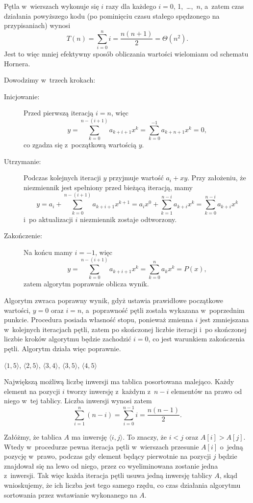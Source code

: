 Pętla  w~wierszach \doubledash{\ref{li:naive-polynomial-evaluation-for-begin}}{\ref{li:naive-polynomial-evaluation-for-end}} wykonuje się $i$ razy dla każdego $i=0$, 1,~\dots,~$n$, a~zatem czas działania powyższego kodu (po pominięciu czasu stałego spędzonego na przypisaniach) wynosi
\[
	T(n) = \sum_{i=0}^ni = \frac{n(n+1)}{2} = \Theta(n^2).
\]
Jest to więc mniej efektywny sposób obliczania wartości wielomianu od schematu Hornera.

\subproblem %
Dowodzimy w~trzech krokach:
\begin{description}
	\item[Inicjowanie:] Przed pierwszą iteracją $i=n$, więc
	\[
	    y = \sum_{k=0}^{n-(i+1)}a_{k+i+1}x^k = \sum_{k=0}^{-1}a_{k+n+1}x^k = 0,
	\]
	co zgadza się z~początkową wartością $y$.
	\item[Utrzymanie:] Podczas kolejnych iteracji $y$ przyjmuje wartość $a_i+xy$. Przy założeniu, że niezmiennik jest spełniony przed bieżącą iteracją, mamy
	\[
		y = a_i+\sum_{k=0}^{n-(i+1)}a_{k+i+1}x^{k+1} = a_ix^0+\sum_{k=1}^{n-i}a_{k+i}x^k = \sum_{k=0}^{n-i}a_{k+i}x^k
	\]
	i~po aktualizacji $i$ niezmiennik zostaje odtworzony.
	\item[Zakończenie:] Na końcu mamy $i=-1$, więc
	\[
		y = \sum_{k=0}^{n-(i+1)}a_{k+i+1}x^k = \sum_{k=0}^na_kx^k = P(x),
	\]
	zatem algorytm poprawnie oblicza wynik.
\end{description}

\subproblem %
Algorytm zwraca poprawny wynik, gdyż ustawia prawidłowe początkowe wartości, $y=0$ oraz $i=n$, a~poprawność pętli  została wykazana w~poprzednim punkcie. Procedura posiada własność stopu, ponieważ zmienna $i$ jest zmniejszana w~kolejnych iteracjach pętli, zatem po skończonej liczbie iteracji i~po skończonej liczbie kroków algorytmu będzie zachodzić $i=0$, co jest warunkiem zakończenia pętli. Algorytm działa więc poprawnie.


\subproblem %
$\langle1,5\rangle$, $\langle2,5\rangle$, $\langle3,4\rangle$, $\langle3,5\rangle$, $\langle4,5\rangle$

\subproblem %
Największą możliwą liczbę inwersji ma tablica posortowana malejąco. Każdy element na pozycji $i$ tworzy inwersję z~każdym z~$n-i$ elementów na prawo od niego w~tej tablicy. Liczba inwersji wynosi zatem
\[
	\sum_{i=1}^n(n-i) = \sum_{i=0}^{n-1}i = \frac{n(n-1)}{2}.
\]

\subproblem %
Załóżmy, że tablica $A$ ma inwersję $\langle i,j\rangle$. To znaczy, że $i<j$ oraz $A[i]>A[j]$. Wtedy w~procedurze  pewna iteracja pętli  w~wierszach  przesunie $A[i]$ o~jedną pozycję w~prawo, podczas gdy element będący pierwotnie na pozycji $j$ będzie znajdował się na lewo od niego, przez co wyeliminowana zostanie jedna z~inwersji. Tak więc każda iteracja pętli  usuwa jedną inwersję tablicy $A$, skąd wnioskujemy, że ich liczba jest tego samego rzędu, co czas działania algorytmu sortowania przez wstawianie wykonanego na $A$.

